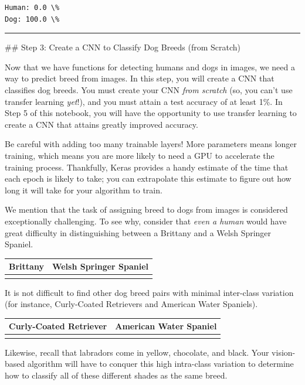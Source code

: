 \documentclass[11pt]{article}
\begin{document}
    \begin{Verbatim}[commandchars=\\\{\}]
Human: 0.0 \%
Dog: 100.0 \%

    \end{Verbatim}

    \begin{center}\rule{0.5\linewidth}{\linethickness}\end{center}

 \#\# Step 3: Create a CNN to Classify Dog Breeds (from Scratch)

Now that we have functions for detecting humans and dogs in images, we
need a way to predict breed from images. In this step, you will create a
CNN that classifies dog breeds. You must create your CNN \emph{from
scratch} (so, you can't use transfer learning \emph{yet}!), and you must
attain a test accuracy of at least 1\%. In Step 5 of this notebook, you
will have the opportunity to use transfer learning to create a CNN that
attains greatly improved accuracy.

Be careful with adding too many trainable layers! More parameters means
longer training, which means you are more likely to need a GPU to
accelerate the training process. Thankfully, Keras provides a handy
estimate of the time that each epoch is likely to take; you can
extrapolate this estimate to figure out how long it will take for your
algorithm to train.

We mention that the task of assigning breed to dogs from images is
considered exceptionally challenging. To see why, consider that
\emph{even a human} would have great difficulty in distinguishing
between a Brittany and a Welsh Springer Spaniel.

\begin{longtable}[]{@{}ll@{}}
\toprule
Brittany & Welsh Springer Spaniel\tabularnewline
\midrule
\endhead
&\tabularnewline
\bottomrule
\end{longtable}

It is not difficult to find other dog breed pairs with minimal
inter-class variation (for instance, Curly-Coated Retrievers and
American Water Spaniels).

\begin{longtable}[]{@{}ll@{}}
\toprule
Curly-Coated Retriever & American Water Spaniel\tabularnewline
\midrule
\endhead
&\tabularnewline
\bottomrule
\end{longtable}

Likewise, recall that labradors come in yellow, chocolate, and black.
Your vision-based algorithm will have to conquer this high intra-class
variation to determine how to classify all of these different shades as
the same breed.
\end{document}
